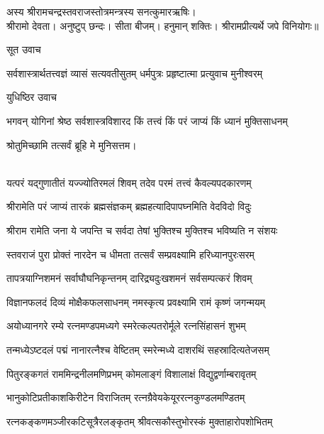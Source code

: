 
अस्य श्रीरामचन्द्रस्तवराजस्तोत्रमन्त्रस्य सनत्कुमारऋषिः। \\
श्रीरामो देवता। अनुष्टुप् छन्दः। सीता बीजम्। हनुमान् शक्तिः। 
श्रीरामप्रीत्यर्थे जपे विनियोगः॥

सूत उवाच\nopagebreak[4]

\twolineshloka
{सर्वशास्त्रार्थतत्त्वज्ञं व्यासं सत्यवतीसुतम्}
{धर्मपुत्रः प्रहृष्टात्मा प्रत्युवाच मुनीश्वरम्}%

युधिष्ठिर उवाच\nopagebreak[4]

\twolineshloka
{भगवन् योगिनां श्रेष्ठ सर्वशास्त्रविशारद}
{किं तत्त्वं किं परं जाप्यं किं ध्यानं मुक्तिसाधनम्}%

{श्रोतुमिच्छामि तत्सर्वं ब्रूहि मे मुनिसत्तम।}\\\\%

\twolineshloka
{यत्परं यद्गुणातीतं यज्ज्योतिरमलं शिवम्}
{तदेव परमं तत्त्वं कैवल्यपदकारणम्}%

\twolineshloka
{श्रीरामेति परं जाप्यं तारकं ब्रह्मसंज्ञकम्}
{ब्रह्महत्यादिपापघ्नमिति वेदविदो विदुः}%

\twolineshloka
{श्रीराम रामेति जना ये जपन्ति च सर्वदा}
{तेषां भुक्तिश्च मुक्तिश्च भविष्यति न संशयः}%

\twolineshloka
{स्तवराजं पुरा प्रोक्तं नारदेन च धीमता}
{तत्सर्वं सम्प्रवक्ष्यामि हरिध्यानपुरःसरम्}%

\twolineshloka
{तापत्रयाग्निशमनं सर्वाघौघनिकृन्तनम्}
{दारिद्र्यदुःखशमनं सर्वसम्पत्करं शिवम्}%

\twolineshloka
{विज्ञानफलदं दिव्यं मोक्षैकफलसाधनम्}
{नमस्कृत्य प्रवक्ष्यामि रामं कृष्णं जगन्मयम्}%

\twolineshloka
{अयोध्यानगरे रम्ये रत्नमण्डपमध्यगे}
{स्मरेत्कल्पतरोर्मूले रत्नसिंहासनं शुभम्}%

\twolineshloka
{तन्मध्येऽष्टदलं पद्मं नानारत्नैश्च वेष्टितम्}
{स्मरेन्मध्ये दाशरथिं सहस्रादित्यतेजसम्}%

\twolineshloka
{पितुरङ्कगतं राममिन्द्रनीलमणिप्रभम्}
{कोमलाङ्गं विशालाक्षं विद्युद्वर्णाम्बरावृतम्}%

\twolineshloka
{भानुकोटिप्रतीकाशकिरीटेन विराजितम्}
{रत्नग्रैवेयकेयूररत्नकुण्डलमण्डितम्}%

\twolineshloka
{रत्नकङ्कणमञ्जीरकटिसूत्रैरलङ्कृतम्}
{श्रीवत्सकौस्तुभोरस्कं मुक्ताहारोपशोभितम्}%

